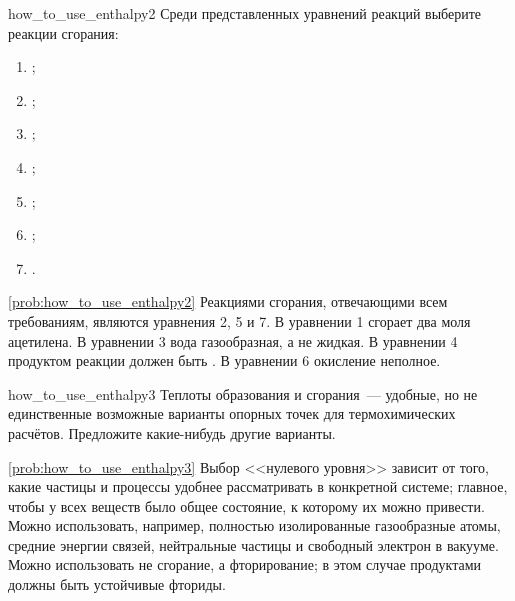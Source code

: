 \begin{problem}{}{how_to_use_enthalpy2}
    Среди представленных уравнений реакций выберите реакции сгорания:
    \begin{enumerate}[label=\arabic*)]
        \item {};
        \item {};
        \item {};
        \item {};
        \item {};
        \item {};
        \item {}.
    \end{enumerate}
    \begin{sol}{\ref{prob:how_to_use_enthalpy2}}
        Реакциями сгорания, отвечающими всем требованиям, являются уравнения 2, 5 и 7. В уравнении 1 сгорает два моля ацетилена. В уравнении 3 вода газообразная, а не жидкая. В уравнении 4 продуктом реакции должен быть . В уравнении 6 окисление неполное.
    \end{sol}
\end{problem}

\begin{problem}{}{how_to_use_enthalpy3}
    Теплоты образования и сгорания~--- удобные, но не единственные возможные варианты опорных точек для термохимических расчётов. Предложите какие-нибудь другие варианты.
    \begin{sol}{\ref{prob:how_to_use_enthalpy3}}
        Выбор <<нулевого уровня>> зависит от того, какие частицы и процессы удобнее рассматривать в конкретной системе; главное, чтобы у всех веществ было общее состояние, к которому их можно привести. Можно использовать, например, полностью изолированные газообразные атомы, средние энергии связей, нейтральные частицы и свободный электрон в вакууме. Можно использовать не сгорание, а фторирование; в этом случае продуктами должны быть устойчивые фториды.
    \end{sol}
\end{problem}

